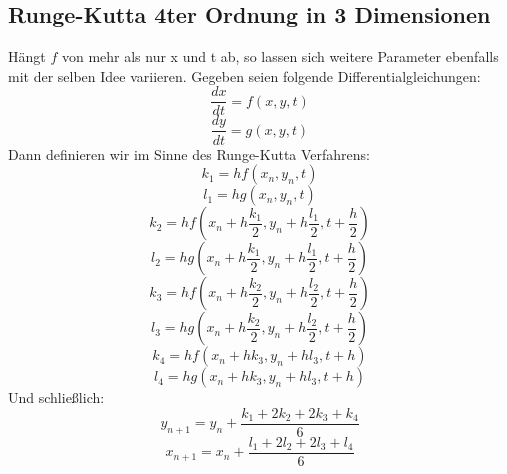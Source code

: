 \documentclass[12pt,a4paper]{article}
\begin{document}
\subsection {Runge-Kutta 4ter Ordnung in 3 Dimensionen}
Hängt $f$ von mehr als nur x und t ab, so lassen sich weitere Parameter ebenfalls mit der selben Idee variieren.
Gegeben seien folgende Differentialgleichungen:
$$\frac{dx}{dt}=f(x,y,t)$$
$$\frac{dy}{dt}=g(x,y,t)$$
Dann definieren wir im Sinne des Runge-Kutta Verfahrens:
$$k_1 = hf(x_n,y_n,t)$$
$$l_1 = hg(x_n,y_n,t)$$
$$k_2 = hf(x_n+h\frac{k_1}{2},y_n+h\frac{l_1}{2},t+\frac{h}{2})$$
$$l_2 = hg(x_n+h\frac{k_1}{2},y_n+h\frac{l_1}{2},t+\frac{h}{2})$$
$$k_3 = hf(x_n+h\frac{k_2}{2},y_n+h\frac{l_2}{2},t+\frac{h}{2})$$
$$l_3 = hg(x_n+h\frac{k_2}{2},y_n+h\frac{l_2}{2},t+\frac{h}{2})$$
$$k_4 = hf(x_n+hk_3,y_n+hl_3,t+h)$$
$$l_4 = hg(x_n+hk_3,y_n+hl_3,t+h)$$
Und schließlich:
$$y_{n+1} = y_n + \frac{k_1 + 2k_2 + 2k_3 + k_4}{6}$$
$$x_{n+1} = x_n + \frac{l_1 + 2l_2 + 2l_3 + l_4}{6}$$
\end{document}
